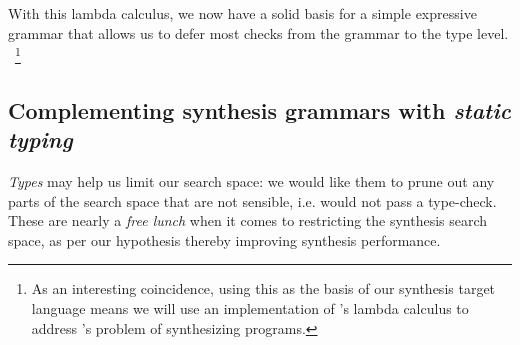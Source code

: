 \documentclass{article}
\begin{document}

With this lambda calculus, we now have a solid basis for a simple expressive grammar that allows us to defer most checks from the grammar to the type level.%
~\footnote{
    As an interesting coincidence,
    using this as the basis of our synthesis target language means
    we will use an implementation of \citet{lambdacalculus}'s lambda calculus
    to address \citet{church1957applications}'s problem of synthesizing programs.
}

\subsection{Complementing synthesis grammars with \emph{static typing}} \label{sec:statictyping}

\emph{Types} may help us limit our search space:
we would like them to prune out any parts of the search space that are not sensible,
i.e. would not pass a type-check.
These are nearly a \emph{free lunch} when it comes to restricting the synthesis search space,
as per our hypothesis %
thereby improving synthesis performance.
\end{document}
